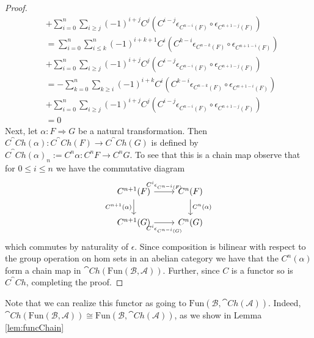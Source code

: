 \begin{proof}
\begin{align*}
        &+ \sum_{i=0}^n\sum_{i\geq j}(-1)^{i+j}C^j\left(C^{i-j}\epsilon_{C^{n-i}(F)}\circ \epsilon_{C^{n+1-j}(F)} \right)\\ 
        &= \sum_{i=0}^n\sum_{i\leq k}^n(-1)^{i+k+1}C^{i}\left(C^{k-i}\epsilon_{C^{n-k}(F)}\circ \epsilon_{C^{n+1-i}(F)}\right) \tag{Naturality of $\epsilon$} \\
        &+ \sum_{i=0}^n\sum_{i\geq j}(-1)^{i+j}C^j\left(C^{i-j}\epsilon_{C^{n-i}(F)}\circ \epsilon_{C^{n+1-j}(F)} \right)\\ 
        &= -\sum_{k=0}^n\sum_{k\geq i}(-1)^{i+k}C^{i}\left(C^{k-i}\epsilon_{C^{n-k}(F)}\circ \epsilon_{C^{n+1-i}(F)}\right) \tag{Re-ordering the sum} \\
        &+ \sum_{i=0}^n\sum_{i\geq j}(-1)^{i+j}C^j\left(C^{i-j}\epsilon_{C^{n-i}(F)}\circ \epsilon_{C^{n+1-j}(F)} \right) \\
        &= 0
    \end{align*}
    Next, let $\alpha:F\Rightarrow G$ be a natural transformation. Then $C^\cat{Ch}(\alpha):C^\cat{Ch}(F)\rightarrow C^\cat{Ch}(G)$ is defined by $C^\cat{Ch}(\alpha)_n:= C^n\alpha:C^nF\rightarrow C^nG$. To see that this is a chain map observe that for $0 \leq i \leq n$ we have the commutative diagram
    \[\begin{tikzcd}
    	{C^{n+1}(F)} & {C^n(F)} \\
    	{C^{n+1}(G)} & {C^n(G)}
    	\arrow["{C^i\epsilon_{C^{n-i}(F)}}", from=1-1, to=1-2]
    	\arrow["{C^n(\alpha)}", from=1-2, to=2-2]
    	\arrow["{C^{n+1}(\alpha)}"', from=1-1, to=2-1]
    	\arrow["{C^i\epsilon_{C^{n-i}(G)}}"', from=2-1, to=2-2]
    \end{tikzcd}\]
    which commutes by naturality of $\epsilon$. Since composition is bilinear with respect to the group operation on hom sets in an abelian category we have that the $C^n(\alpha)$ form a chain map in $\cat{Ch}(\text{Fun}(\mathcal{B},\mathcal{A}))$. Further, since $C$ is a functor so is $C^\cat{Ch}$, completing the proof.
\end{proof}

Note that we can realize this functor as going to $\text{Fun}(\mathcal{B},\cat{Ch}(\mathcal{A}))$. Indeed, $\cat{Ch}(\text{Fun}(\mathcal{B},\mathcal{A}))\cong \text{Fun}(\mathcal{B},\cat{Ch}(\mathcal{A}))$, as we show in Lemma \ref{lem:funcChain}


